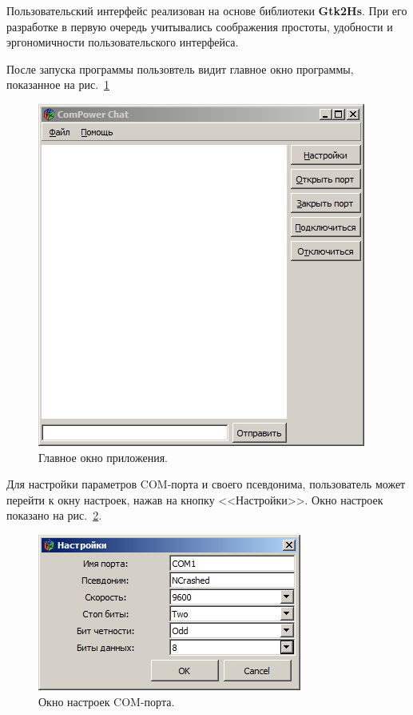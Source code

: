 \documentclass[russian,utf8,simple,emptystyle]{eskdtext}
\begin{document}
Пользовательский интерфейс реализован на основе библиотеки \textbf{Gtk2Hs}. При его разработке в первую очередь учитывались соображения простоты, удобности и эргономичности пользовательского интерфейса.

После запуска программы пользовтель видит главное окно программы, показанное на рис.~\ref{fig:main-window}

\begin{figure}[!h]
\centering
\includegraphics[scale=1.0]{main_window}
\caption{Главное окно приложения.}
\label{fig:main-window}
\end{figure}

Для настройки параметров COM-порта и своего псевдонима, пользователь может перейти к окну настроек, нажав на кнопку <<Настройки>>. Окно настроек показано на рис.~\ref{fig:options-window}.

\begin{figure}[!h]
\centering
\includegraphics[scale=1.0]{options_window}
\caption{Окно настроек COM-порта.}
\label{fig:options-window}
\end{figure}
\end{document}
